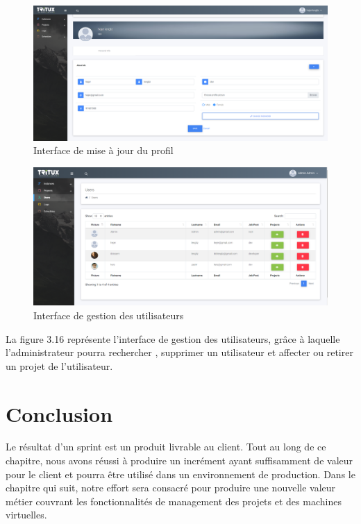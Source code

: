 	\begin{figure}[H]
	\centering
	\includegraphics[scale=0.35]{editprofile.PNG}
	\caption{Interface de mise à jour du profil}
	\label{Interface de mise à jour du profil}
\end{figure}
	\begin{figure}[H]
	\centering
	\includegraphics[scale=0.35]{users.PNG}
	\caption{Interface de gestion des utilisateurs}
	\label{Interface de gestion des utilisateurs}
\end{figure}
La figure 3.16 représente l'interface de gestion des utilisateurs, grâce à laquelle l'administrateur
pourra rechercher , supprimer un utilisateur et  affecter ou retirer un projet de l'utilisateur.


\section{Conclusion}
Le résultat d'un sprint est un produit livrable au client. Tout au long de ce chapitre,
nous avons réussi à produire un incrément ayant suffisamment de valeur pour le client
et pourra être utilisé dans un environnement de production. Dans le chapitre qui suit,
notre effort sera consacré pour produire une nouvelle valeur métier couvrant les fonctionnalités
de management des projets et des machines virtuelles.
